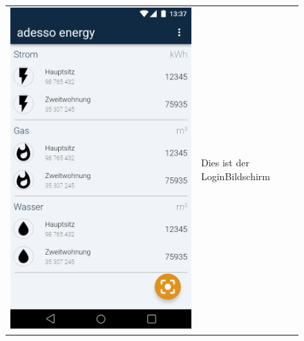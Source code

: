 \begin{figure}[h]
\begin{tabularx}{\textwidth}{X | X}
	\includegraphics[scale = 0.22]{img/AndroidMockup/Main} & Dies ist der LoginBildschirm \\
\end{tabularx}
\end{figure}


